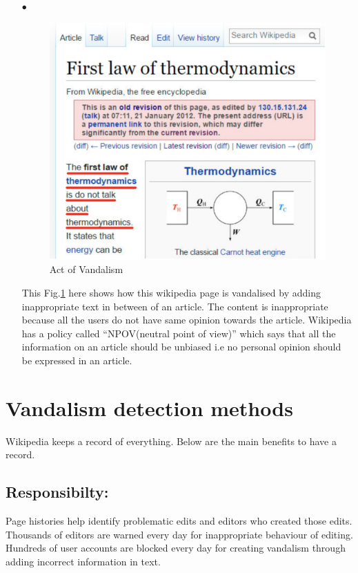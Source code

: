 \documentclass[12pt]{article}
\begin{document}
\begin{itemize}
\item[$\bullet$ ]
\begin{figure}[h]
\centering
\includegraphics[scale=0.5]{thermodynamics}
\caption{Act of Vandalism \cite{vandalism}}
\label{thermodynamics.png}
\end{figure}
This Fig.\ref{thermodynamics.png} here shows how this wikipedia page is vandalised by adding  inappropriate text in between of an article. The content is inappropriate because all the users do not have same opinion towards the article. Wikipedia has a policy called “NPOV(neutral point of view)” which says that all the information on an article should be unbiased i.e no personal opinion should be expressed in an article.
\end{itemize}
\section{Vandalism detection methods}
Wikipedia keeps a record of everything\cite{help}. Below are the main benefits to have a record.
\subsection*{Responsibilty:}
Page histories help identify problematic edits and  editors who created those edits. Thousands of editors are warned every day for inappropriate behaviour of editing. Hundreds of user accounts are blocked every day for creating vandalism through adding incorrect information in text.
\end{document}
